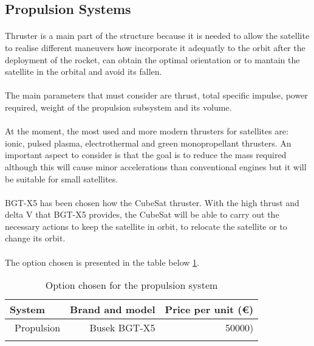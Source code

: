 \subsection{Propulsion Systems}

\paragraph{}
Thruster is a main part of the structure because it is needed to allow the satellite to realise different maneuvers how incorporate it adequatly to the orbit after the deployment of the rocket, can obtain the optimal orientation or to mantain the satellite in the orbital and avoid its fallen. 

\paragraph{}
The main parameters that must consider are thrust, total specific impulse, power required, weight of the  propulsion subsystem and its volume.

\paragraph{}
At the moment, the most used and more modern thrusters for satellites are: ionic, pulsed plasma, electrothermal and green monopropellant thrusters. An important aspect to consider is that the goal is to reduce the mass required although this will cause minor accelerations than conventional engines but it will be suitable for small satellites.

\paragraph{}
BGT-X5 has been chosen how the CubeSat thruster. With the high thrust and delta V that BGT-X5 provides, the CubeSat will be able to carry out the necessary actions to keep the satellite in orbit, to relocate the satellite or to change its orbit.

\paragraph{}The option chosen is presented in the table below \ref{propulsionfinal}.

\begin{longtable}{| l | r | r | }
\hline
\rowcolor[gray]{0.80}	\textbf{System} &  \textbf{Brand and model}     & \textbf{Price per unit (\euro)}   \\
\hline
\endfirsthead

	   ~Propulsion & Busek BGT-X5 & 50000) \\
	\hline

\caption{Option chosen for the propulsion system}
\label{propulsionfinal}
\end{longtable}
